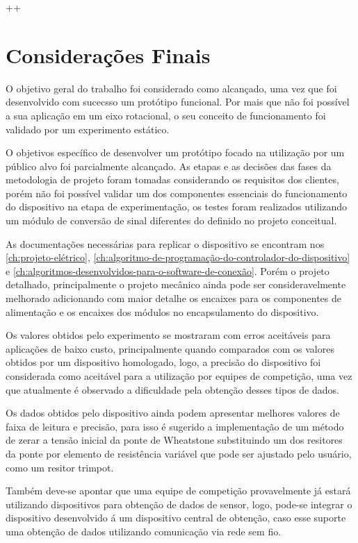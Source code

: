 ++

\chapter{Considerações Finais}

O objetivo geral do trabalho foi considerado como alcançado, uma vez que foi desenvolvido com sucecsso um protótipo funcional.
Por mais que não foi possível a sua aplicação em um eixo rotacional, o seu conceito de funcionamento foi validado por um experimento estático.

O objetivos específico de desenvolver um protótipo focado na utilização por um público alvo foi parcialmente alcançado.
As etapas e as decisões das fases da metodologia de projeto foram tomadas considerando os requisitos dos clientes, porém não foi possível validar
um dos componentes essenciais do funcionamento do dispositivo na etapa de experimentação, os testes foram realizados utilizando um módulo de conversão
de sinal diferentes do definido no projeto conceitual.

As documentações necessárias para replicar o dispositivo se encontram nos \autoref{ch:projeto-elétrico}, \autoref{ch:algoritmo-de-programação-do-controlador-do-dispositivo}
e \autoref{ch:algoritmos-desenvolvidos-para-o-software-de-conexão}.
Porém o projeto detalhado, principalmente o projeto mecânico ainda pode ser consideravelmente melhorado adicionando com maior detalhe os encaixes para os componentes de alimentação
e os encaixes dos módulos no encapsulamento do dispositivo.

Os valores obtidos pelo experimento se mostraram com erros aceitáveis para aplicações de baixo custo, principalmente quando comparados com os
valores obtidos por um dispositivo homologado, logo, a precisão do dispositivo foi considerada como aceitável para a utilização por equipes de competição,
uma vez que atualmente é observado a dificuldade pela obtenção desses tipos de dados.

Os dados obtidos pelo dispositivo ainda podem apresentar melhores valores de faixa de leitura e precisão, para isso é sugerido a implementação de um método de zerar a tensão
inicial da ponte de Wheatstone substituindo um dos resitores da ponte por elemento de resistência variável que pode ser ajustado pelo usuário, como um resitor trimpot.

Também deve-se apontar que uma equipe de competição provavelmente já estará utilizando dispositivos para obtenção de dados de sensor, logo, pode-se integrar o dispositivo desenvolvido
á um dispositivo central de obtenção, caso esse suporte uma obtenção de dados utilizando comunicação via rede sem fio.

